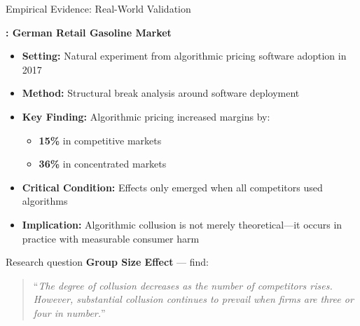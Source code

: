 \documentclass[10pt, aspectratio=169]{beamer}
\begin{document}
\begin{frame}{Empirical Evidence: Real-World Validation}
    \begin{center}
    \begin{block}{\textbf{\textcite{assad_algorithmic_2024}: German Retail Gasoline Market}}
    \begin{itemize}
        \item \textbf{Setting:} Natural experiment from algorithmic pricing software adoption in 2017
        \item \textbf{Method:} Structural break analysis around software deployment
        \item \textbf{Key Finding:} Algorithmic pricing increased margins by:
        \begin{itemize}
            \item \textbf{15\%} in competitive markets
            \item \textbf{36\%} in concentrated markets
        \end{itemize}
        \item \textbf{Critical Condition:} Effects only emerged when all competitors used algorithms
        \item \textbf{Implication:} Algorithmic collusion is not merely theoretical---it occurs in practice with measurable consumer harm
    \end{itemize}
    \end{block}
    \end{center}
\end{frame}

\begin{frame}{Research question}
    \textbf{Group Size Effect} --- \textcite[]{calvano_artificial_2020} find: 
    
    \begin{quote}
        \enquote{\emph{The degree of collusion decreases as the number of competitors rises. However,   substantial collusion continues to prevail when firms are three or four in number.}}
    \end{quote}
    \vfill
    \begin{center}
    \end{center}
\end{frame}
\end{document}
